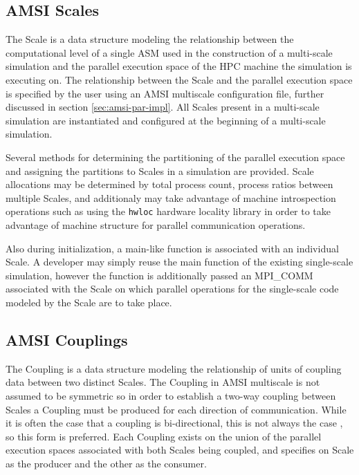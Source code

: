 \documentclass[review]{siamart1116}
\begin{document}
\subsection{AMSI Scales}\label{sec:scale}

The Scale is a data structure modeling the relationship between the computational level of a single ASM used in the construction of a multi-scale simulation and the parallel execution space of the HPC machine the simulation is executing on. The relationship between the Scale and the parallel execution space is specified by the user using an AMSI multiscale configuration file, further discussed in section \ref{sec:amsi-par-impl}. All Scales present in a multi-scale simulation are instantiated and configured at the beginning of a multi-scale simulation.

Several methods for determining the partitioning of the parallel execution space and assigning the partitions to Scales in a simulation are provided. Scale allocations may be determined by total process count, process ratios between multiple Scales, and additionaly may take advantage of machine introspection operations such as using the \verb-hwloc- \cite{broquedis2010hwloc} hardware locality library in order to take advantage of machine structure for parallel communication operations.

Also during initialization, a main-like function is associated with an individual Scale. A developer may simply reuse the main function of the existing single-scale simulation, however the function is additionally passed an MPI\_COMM associated with the Scale on which parallel operations for the single-scale code modeled by the Scale are to take place.

\subsection{AMSI Couplings}\label{sec:coupling}

The Coupling is a data structure modeling the relationship of units of coupling data between two distinct Scales. The Coupling in AMSI multiscale is not assumed to be symmetric so in order to establish a two-way coupling between Scales a Coupling must be produced for each direction of communication. While it is often the case that a coupling is bi-directional, this is not always the case \cite{gravemeier2008towards}, so this form is preferred. Each Coupling exists on the union of the parallel execution spaces associated with both Scales being coupled, and specifies on Scale as the producer and the other as the consumer.
\end{document}

